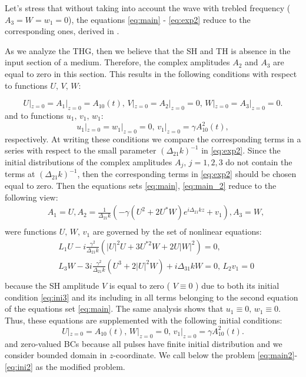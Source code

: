 \documentclass[a4paper, 12pt, onecolumn]{extarticle}
\begin{document}
Let's stress that without taking into account the wave with trebled frequency (\(A_3=W=w_1=0\)),  the equations \eqref{eq:main} -  \eqref{eq:exp2} reduce to the corresponding ones, derived in \cite{bib:n19}.

As we analyze the THG, then we believe that  the  SH and TH is absence in the input section of a medium. Therefore, the complex amplitudes \(A_2\) and \(A_3\) are equal to zero in this section. This results in the following conditions with respect to functions  \(U,\,V,\,W\):

\begin{equation}
\label{eq:ini3}
U|_{z=0}=A_1|_{z=0}=A_{10}(t),\,
V|_{z=0}=A_2|_{z=0}=0,\,
W|_{z=0}=A_3|_{z=0}=0.
\end{equation}
and to functions \(u_1,\,v_1,\,w_1\):
\begin{equation}
\label{eq:ini4}
 u_1|_{z=0}=w_1|_{z=0}=0,\, v_1|_{z=0}=\gamma A_{10}^2(t),
\end{equation}
respectively. At writing these conditions we  compare the corresponding terms in a series with respect to the small parameter \((\Delta_{21}k)^{-1}\) in \eqref{eq:exp2}. Since the initial distributions of the complex amplitudes \(A_j,\,j=1,2,3\) do not contain the terms at \((\Delta_{21}k)^{-1}\), then the corresponding terms in \eqref{eq:exp2} should be chosen equal to zero. Then the equations sets \eqref{eq:main}, \eqref{eq:main_2} reduce to the following view:
\begin{equation}
\label{eq:exp3}
\begin{aligned}
&A_1=U, A_2=\frac{1}{\Delta_{21}k}(-\gamma (U^2+2U^*W)e^{i\Delta_{21}kz}+v_1), A_3=W,\\
\end{aligned}
\end{equation}
were functions \(U,\,W,\,v_1\) are governed by the set of nonlinear equations:
\begin{equation}
\label{eq:main2}
\begin{aligned}
&L_1U-i\frac{\gamma^2}{\Delta_{21} k}(|U|^2U+3U^{*2}W+2U|W|^2)=0,\\
&L_3W-3i\frac{\gamma^2}{\Delta_{21} k}(U^3+2|U|^2W)+i\Delta_{31}kW=0,\,L_2 v_1=0\\
\end{aligned}
\end{equation}
because the SH amplitude \(V\) is equal to zero ( \(V\equiv0\) ) due to both its initial condition \eqref{eq:ini3} and its including  in all terms belonging to the second equation of the equations set \eqref{eq:main}. The same analysis shows that \(u_1\equiv0,\,w_1\equiv0\).
Thus, these equations are supplemented with the following initial conditions:
\begin{equation}
\label{eq:ini2}
U|_{z=0}=A_{10}(t),\,W|_{z=0}=0,\,v_1|_{z=0}=\gamma A_{10}^2(t).
\end{equation}
and zero-valued BCs because all pulses have finite initial distribution and we consider bounded domain in \(z\)-coordinate. We call below the problem \eqref{eq:main2}-\eqref{eq:ini2} as the modified problem.
\end{document}
